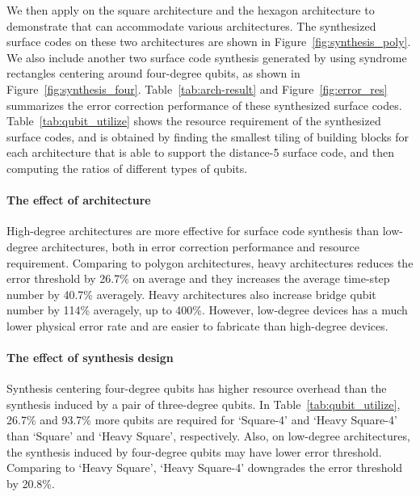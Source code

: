 We then apply \myCompilerNameSpace on the square architecture and the hexagon architecture to demonstrate that \myCompilerNameSpace can accommodate various architectures.
The synthesized surface codes on these two architectures are shown in Figure~\ref{fig:synthesis_poly}.
We also include another two surface code synthesis generated by using syndrome rectangles centering around four-degree qubits, as shown in Figure~\ref{fig:synthesis_four}.
Table~\ref{tab:arch-result} and Figure~\ref{fig:error_res} summarizes the error correction performance of these synthesized surface codes.
Table~\ref{tab:qubit_utilize} shows the resource requirement of the synthesized surface codes, and is obtained by finding the smallest tiling of building blocks for each architecture that is able to support the distance-5 surface code, and then computing the ratios of different types of qubits. 

\paragraph{The effect of architecture} High-degree architectures are more effective for surface code synthesis than low-degree architectures, both in error correction performance and resource requirement. Comparing to polygon architectures, heavy architectures reduces the error threshold by 26.7\% on average and they increases the average time-step number by 40.7\% averagely. Heavy architectures also increase bridge qubit number by 114\% averagely, up to 400\%. However, low-degree devices has a much lower physical error rate and are easier to fabricate than high-degree devices.

\paragraph{The effect of synthesis design} Synthesis centering four-degree qubits has higher resource overhead than the synthesis induced by a pair of three-degree qubits. In Table~\ref{tab:qubit_utilize}, 26.7\% and 93.7\%  more qubits are required for `\myCompilerNameSpace Square-4' and `\myCompilerNameSpace Heavy Square-4' than `\myCompilerNameSpace Square' and `\myCompilerNameSpace Heavy Square', respectively. 
Also, on low-degree architectures, the synthesis induced by four-degree qubits may have lower error threshold. Comparing to `\myCompilerNameSpace Heavy Square', `\myCompilerNameSpace Heavy Square-4' downgrades the error threshold by 20.8\%.

